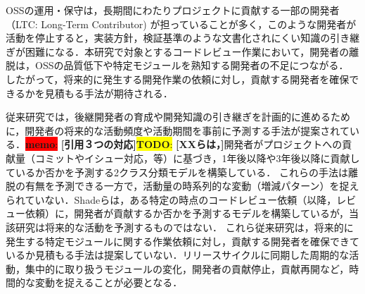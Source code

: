 \documentclass[submit,noauthor,ses,dvipdfmx]{ipsj}
\newcommand{\todo}[1]{\colorbox{yellow}{{\bf TODO}:}{\color{red} {\textbf{[#1]}}}}
\newcommand{\memo}[1]{\colorbox{red}{{\bf memo}:}{\color{blue} {\textbf{[#1]}}}}
\begin{document}
OSSの運用・保守は，長期間にわたりプロジェクトに貢献する一部の開発者（LTC: Long-Term Contributor) が担っていることが多く，このような開発者が活動を停止すると，実装方針，検証基準のような文書化されにくい知識の引き継ぎが困難になる．本研究で対象とするコードレビュー作業において，開発者の離脱は，OSSの品質低下や特定モジュールを熟知する開発者の不足につながる\cite{bacchelli}\cite{mcintosh}．
したがって，将来的に発生する開発作業の依頼に対し，貢献する開発者を確保できるかを見積もる手法が期待される．

従来研究では，後継開発者の育成や開発知識の引き継ぎを計画的に進めるために，開発者の将来的な活動頻度や活動期間を事前に予測する手法が提案されている．\memo{引用３つの対応}\todo{XXらは，}開発者がプロジェクトへの貢献量（コミットやイシュー対応，等）に基づき，1年後以降や3年後以降に貢献しているか否かを予測する2クラス分類モデルを構築している\cite{zhou}\cite{bao}\cite{constantinou}．
これらの手法は離脱の有無を予測できる一方で，活動量の時系列的な変動（増減パターン）を捉えられていない．Shadeらは，ある特定の時点のコードレビュー依頼（以降，レビュー依頼）に，開発者が貢献するか否かを予測するモデルを構築しているが，当該研究は将来的な活動を予測するものではない．
これら従来研究は，将来的に発生する特定モジュールに関する作業依頼に対し，貢献する開発者を確保できているか見積もる手法は提案していない．リリースサイクルに同期した周期的な活動，集中的に取り扱うモジュールの変化，開発者の貢献停止，貢献再開など，時間的な変動を捉えることが必要となる．


\end{document}
